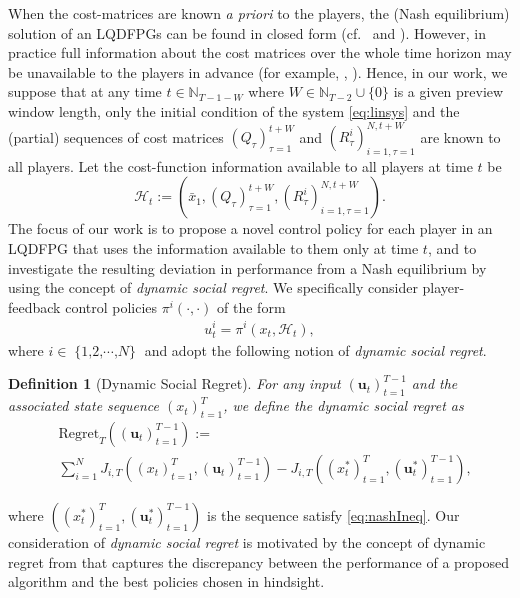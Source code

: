 \documentclass[letterpaper, 10 pt, conference]{ieeeconf}  %
\DeclareMathOperator{\Nplayers}{\{1,2,\cdots,\textit{N}\}}
\newtheorem{definition}{Definition}
\begin{document}
When the cost-matrices are known \emph{a priori} to the players, the (Nash equilibrium) solution of an LQDFPGs can be found in closed form (cf.\ \cite{prasad_structure_2023} and \cite[Chapter 6]{basar_dynamic_1998}).
However, in practice full information about the cost matrices over the whole time horizon may be unavailable to the players in advance (for example, \cite{westenbroek_feedback_2020}, \cite{kouro_model_2009}).
Hence, in our work, we suppose that at any time $t \in \mathbb{N}_{T-1 - W}$ where $W\in\mathbb{N}_{T-2} \cup \{0\}$ is a given preview window length, only the initial condition of the system \eqref{eq:linsys} and the (partial) sequences of cost matrices $(Q_{\tau})_{\tau=1}^{t+W}$ and $(R_{\tau}^i)_{i=1,\tau=1}^{N,t+W}$ are known to all players.
Let the cost-function information available to all players at time $t$ be
\begin{equation}\label{eq:history}
    \mathcal{H}_{t} := (\bar{x}_{1}, (Q_{\tau})_{\tau=1}^{t+W}, (R_{\tau}^i)_{i=1,\tau=1}^{N,t+W}).
\end{equation}
The focus of our work is to propose a novel control policy for each player in an LQDFPG that uses the information available to them only at time $t$, and to investigate the resulting deviation in performance from a Nash equilibrium by using the concept of \emph{dynamic social regret}.
We specifically consider player-feedback control policies $\pi^i (\cdot, \cdot)$ of the form
\begin{align*}
    u_t^i = \pi^i(x_t, \mathcal{H}_t),
\end{align*}
where $i \in \Nplayers$ and adopt the following notion of \emph{dynamic social regret}.

\begin{definition}[Dynamic Social Regret]
For any input $(\mathbf{u}_{t})_{t=1}^{T-1}$ and the associated state sequence $(x_{t})_{t=1}^{T}$, we define the \emph{dynamic social regret} as
\begin{equation}
    \label{eq:regret}
    \begin{split}
        &\text{Regret}_{T}((\mathbf{u}_{t})_{t=1}^{T-1}) := \\
        &\sum_{i=1}^{N} J_{i,T}((x_{t})_{t=1}^{T},(\mathbf{u}_{t})_{t=1}^{T-1}) - J_{i,T}((x_{t}^{*})_{t=1}^{T},(\mathbf{u}_{t}^{*})_{t=1}^{T-1}),
    \end{split}
\end{equation}
\end{definition}
where $((x_{t}^{*})_{t=1}^{T},(\mathbf{u}_{t}^{*})_{t=1}^{T-1})$ is the sequence satisfy \eqref{eq:nashIneq}.
Our consideration of \emph{dynamic social regret} is motivated by the concept of dynamic regret from \cite[Equation (5)]{chen_regret_2023} that captures the discrepancy between the performance of a proposed algorithm and the best policies chosen in hindsight.
\end{document}
